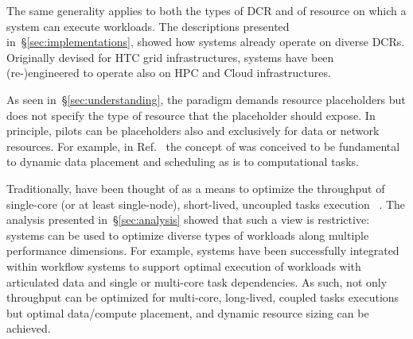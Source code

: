 \documentclass{sig-alternate}
\begin{document}
The same generality applies to both the types of DCR and of resource on which a
\pilot system can execute workloads. The descriptions presented
in~\S\ref{sec:implementations}, showed how \pilot systems already operate on
diverse DCRs. Originally devised for HTC grid infrastructures, \pilot systems
have been (re-)engineered to operate also on HPC and Cloud infrastructures.

As seen in~\S\ref{sec:understanding}, the \pilot paradigm demands resource
placeholders but does not specify the type of resource that the placeholder
should expose. In principle, pilots can be placeholders also and exclusively for
data or network resources. For example, in
Ref.~\cite{luckow2014pilot,santcroos2012} the concept of \pilotdata was
conceived to be fundamental to dynamic data placement and scheduling as \pilot
is to computational tasks.




Traditionally, \pilots have been thought of as a means to optimize the
throughput of single-core (or at least single-node), short-lived, uncoupled
tasks execution ~\cite{pordes2007,sfiligoi2009,juve2010}. The analysis presented
in~\S\ref{sec:analysis} showed that such a view is restrictive: \pilot systems
can be used to optimize diverse types of workloads along multiple performance
dimensions. For example, \pilot systems have been successfully integrated within
workflow systems to support optimal execution of workloads with articulated data
and single or multi-core task dependencies. As such, not only throughput can be
optimized for multi-core, long-lived, coupled tasks executions but optimal
data/compute placement, and dynamic resource sizing can be achieved.
\end{document}
